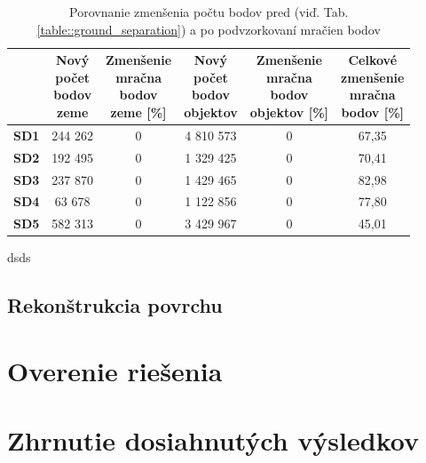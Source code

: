 \begin{table}
    \begin{center} %
        \begin{tabular}{|c || c | c | c | c | c|} 
         \hline
          & \thead{Nový \\ počet \\ bodov \\ zeme} &
            \thead{Zmenšenie \\ mračna \\ bodov \\ zeme [\%]} &
            \thead{Nový \\ počet \\ bodov \\ objektov} &
            \thead{Zmenšenie \\ mračna \\ bodov \\ objektov [\%]} &
            \thead{Celkové \\ zmenšenie \\ mračna \\ bodov [\%]} \\ [0.5ex]    
         \hline\hline
         \textbf{SD1} & 244 262 & 0 & 4 810 573 & 0 & 67,35 \\ 
         \hline
         \textbf{SD2} & 192 495 & 0 & 1 329 425 & 0 & 70,41 \\
         \hline
         \textbf{SD3} &  237 870 & 0 & 1 429 465 & 0 & 82,98 \\
         \hline
         \textbf{SD4} & 63 678 & 0 & 1 122 856 & 0 & 77,80 \\
         \hline
         \textbf{SD5} & 582 313 & 0 & 3 429 967 & 0 & 45,01 \\ 
         \hline
        \end{tabular}
    \caption{Porovnanie zmenšenia počtu bodov pred (viď. Tab. \ref{table::ground_separation}) a po podvzorkovaní mračien bodov}
    \end{center}
\end{table}

dsds

\subsection{Rekonštrukcia povrchu}

\section{Overenie riešenia}

\section{Zhrnutie dosiahnutých výsledkov}